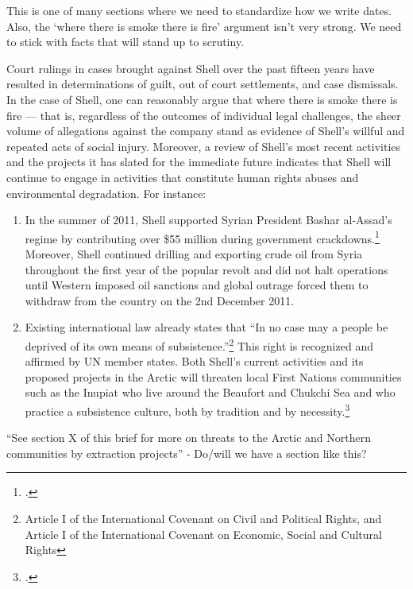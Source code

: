 \begin{vcom}
This is one of many sections where we need to standardize how we write dates. Also, the `where there is smoke there is fire' argument isn't very strong. We need to stick with facts that will stand up to scrutiny.
\end{vcom}
	
	
	
Court rulings in cases brought against Shell over the past fifteen years have resulted in determinations of guilt, out of court settlements, and case dismissals. 
In the case of Shell, one can reasonably argue that where there is smoke there is fire --- that is, regardless of the outcomes of individual legal challenges, the sheer volume of allegations against the company stand as evidence of Shell's willful and repeated acts of social injury. 
Moreover, a review of Shell's most recent activities and the projects it has slated for the immediate future indicates that Shell will continue to engage in activities that constitute human rights abuses and environmental degradation.
For instance:
\begin{enumerate}
	\item In the summer of 2011, Shell supported Syrian President Bashar al-Assad's regime by contributing over \$55 million during government crackdowns.\footcite[][]{Syria_2011} Moreover, Shell continued drilling and exporting crude oil from Syria throughout the first year of the popular revolt and did not halt operations until Western imposed oil sanctions and global outrage forced them to withdraw from the country on the 2nd December 2011.
	\item Existing international law already states that ``In no case may a people be deprived of its own means of subsistence.''\footnote{Article I of the International Covenant on Civil and Political Rights, and Article I of the International Covenant on Economic, Social and Cultural Rights} This right is recognized and affirmed by UN member states. Both Shell's current activities and its proposed projects in the Arctic will threaten local First Nations communities such as the Inupiat who live around the Beaufort and Chukchi Sea and who practice a subsistence culture, both by tradition and by necessity.\footcite[][p. 13]{RiskingRuin_2012}
\end{enumerate}

\begin{vcom}
``See section X of this brief for more on threats to the Arctic and Northern communities by extraction projects'' - Do/will we have a section like this?
\end{vcom}




